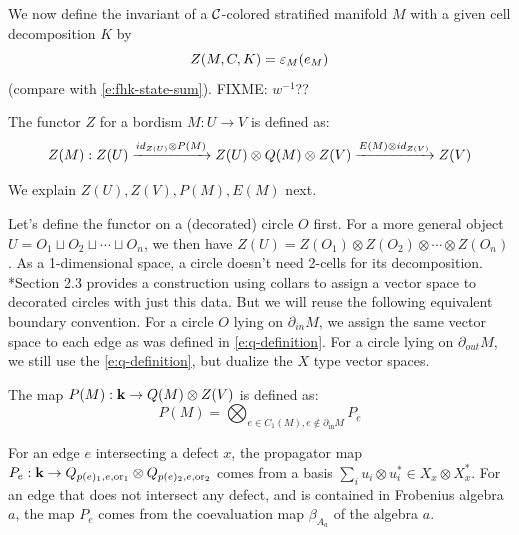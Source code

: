 \begin{defectfiguresetup}
We now define the invariant of a $\mathcal{C}$-colored stratified manifold $M$
with a given cell decomposition $K$ by
\begin{equation}\label{e:defect-state-sum}
  Z(M,C,K)=\varepsilon_M (e_M)
\end{equation}
(compare with \eqref{e:fhk-state-sum}). FIXME: $w^{-1}$??


The functor $Z$ for a bordism $M:U\rightarrow V$ is defined as:
\begin{equation}
	Z(M) : Z(U) \xrightarrow{id_{Z(U)} \otimes P(M)} Z(U) \otimes Q(M) \otimes Z(V) \xrightarrow{E(M) \otimes id_{Z(V)}} Z(V)
\end{equation}

We explain $Z(U), Z(V), P(M), E(M)$ next.


Let's define the functor on a (decorated) circle $O$ first. For a more general object $U=O_1 \sqcup O_2 \sqcup \cdots \sqcup O_n$, we then have $Z(U)=Z(O_1)\otimes Z(O_2) \otimes \cdots \otimes Z(O_n)$. As a 1-dimensional space, a circle doesn't need 2-cells for its decomposition.  *{Section 2.3} provides a construction using collars to assign a vector space to decorated circles with just this data. But we will reuse the following equivalent boundary convention. For a circle $O$ lying on $\partial_{in} M$, we assign the same vector space to each edge as was defined in \eqref{e:q-definition}. For a circle lying on $\partial_{out} M$, we still use the \eqref{e:q-definition}, but dualize the $X$ type vector spaces.

The map $P(M): \mathbf{k} \rightarrow Q(M) \otimes Z(V)$ is defined as:
\begin{equation}
	P(M) = \bigotimes_{e \in C_1(M), e \notin \partial_{\mathrm{in}} M} P_e
\end{equation}

For an edge $e$ intersecting a defect $x$, the propagator map $P_e: \mathbf{k} \rightarrow Q_{p(e)_1,e,\mathrm{or}_1} \otimes Q_{p(e)_2,e,\mathrm{or}_2}$ comes from a basis $\sum_{i} u_i \otimes u_i^* \in X_x \otimes X_x^*$. For an edge that does not intersect any defect, and is contained in Frobenius algebra $a$, the map $P_e$ comes from the coevaluation map $\beta_{A_a}$ of the algebra $a$.


\end{defectfiguresetup}
